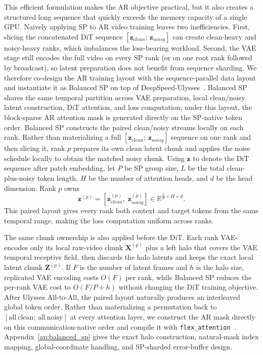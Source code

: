 \documentclass{llmxive}
\begin{document}
This efficient formulation makes the AR objective practical, but it also creates a structured long sequence that quickly exceeds the memory capacity of a single GPU.
Naively applying SP to AR video training leaves two inefficiencies.
First, slicing the concatenated DiT sequence $[\mathbf{z}_{clean};\,\mathbf{z}_{noisy}]$ can create clean-heavy and noisy-heavy ranks, which imbalances the loss-bearing workload.
Second, the VAE stage still encodes the full video on every SP rank (or on one root rank followed by broadcast), so latent preparation does not benefit from sequence sharding.
We therefore co-design the AR training layout with the sequence-parallel data layout and instantiate it as Balanced SP on top of DeepSpeed-Ulysses~\cite{jacobs2023deepspeed}.
Balanced SP shares the same temporal partition across VAE preparation, local clean/noisy latent construction, DiT attention, and loss computation; under this layout, the block-sparse AR attention mask is generated directly on the SP-native token order.
Balanced SP constructs the paired clean/noisy streams locally on each rank.
Rather than materializing a full $[\mathbf{z}_{clean};\,\mathbf{z}_{noisy}]$ sequence on one rank and then slicing it, rank $p$ prepares its own clean latent chunk and applies the noise schedule locally to obtain the matched noisy chunk.
Using $\mathbf{z}$ to denote the DiT sequence after patch embedding, let $P$ be SP group size, $L$ be the total clean-plus-noisy token length, $H$ be the number of attention heads, and $d$ be the head dimension. Rank $p$ owns
\begin{equation}
    \mathbf{z}^{(p)} = \left[\mathbf{z}_{clean}^{(p)},\;
    \mathbf{z}_{noisy}^{(p)}\right]
    \in \mathbb{R}^{\frac{L}{P} \times H \times d}.
\end{equation}
This paired layout gives every rank both context and target tokens from the same temporal range, making the loss computation uniform across ranks.

The same chunk ownership is also applied before the DiT.
Each rank VAE-encodes only its local raw-video chunk $\mathbf{X}^{(p)}$ plus a left halo that covers the VAE temporal receptive field, then discards the halo latents and keeps the exact local latent chunk $\mathbf{Z}^{(p)}$.
If $F$ is the number of latent frames and $h$ is the halo size, replicated VAE encoding costs $O(F)$ per rank, while Balanced SP reduces the per-rank VAE cost to $O(F/P+h)$ without changing the DiT training objective.
After Ulysses All-to-All, the paired layout naturally produces an interleaved global token order.
Rather than materializing a permutation back to $[\mathrm{all\ clean};\,\mathrm{all\ noisy}]$ at every attention layer, we construct the AR mask directly on this communication-native order and compile it with \texttt{flex\_attention}~\cite{dong2024flex}.
Appendix~\ref{ap:balanced_sp} gives the exact halo construction, natural-mask index mapping, global-coordinate handling, and SP-sharded error-buffer design.
\end{document}
